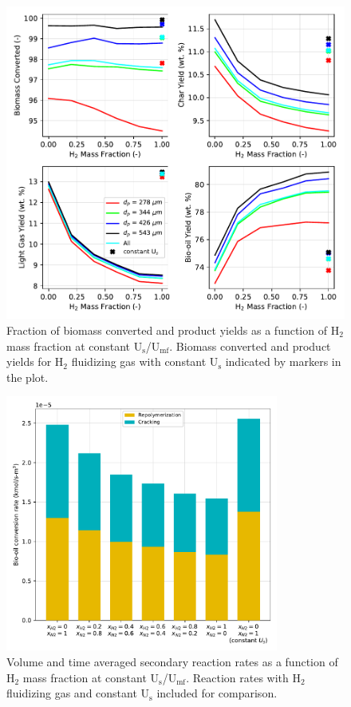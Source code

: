 \begin{figure}[H]
    \centering
    \includegraphics[width=\textwidth]{figures/cfd-constuumf-yields.pdf}
    \caption{Fraction of biomass converted and product yields as a function of H$_2$ mass fraction at constant U$_\text{s}$/U$_\text{mf}$. Biomass converted and product yields for H$_2$ fluidizing gas with constant U$_\text{s}$ indicated by markers in the plot.}
    \label{fig:cfd-constuumf-yields}
\end{figure}

\begin{figure}[H]
    \centering
    \includegraphics[width=0.8\textwidth]{figures/cfd-constuumf-reaction-rates.pdf}
    \caption{Volume and time averaged secondary reaction rates as a function of H$_2$ mass fraction at constant U$_\text{s}$/U$_\text{mf}$. Reaction rates with H$_2$ fluidizing gas and constant U$_\text{s}$ included for comparison.}
    \label{fig:cfd-constuumf-reaction-rates}
\end{figure}
